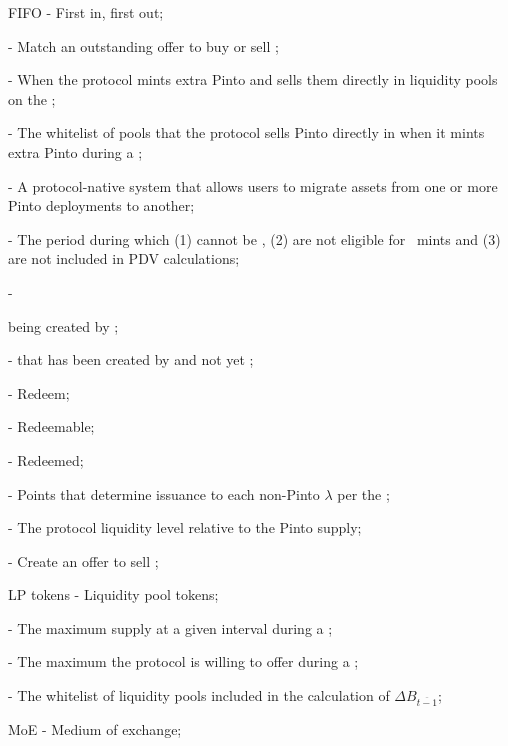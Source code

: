 \documentclass[class=article, crop=false]{standalone}
\begin{document}
\begin{itemize}[topsep=0pt, itemsep=3pt,leftmargin=16pt]
    \item[] FIFO - First in, first out;
    \item[]  - Match an outstanding offer to buy or sell ;
    \item[]  - When the protocol mints extra Pinto and sells them directly in liquidity pools on the ;
    \item[]  - The whitelist of pools that the protocol sells Pinto directly in when it mints extra Pinto during a ;
    \item[]  - A protocol-native system that allows users to migrate assets from one or more Pinto deployments to another;
    \item[]  - The period during which  (1) cannot be , (2) are not eligible for \Pinto\ mints and (3) are not included in  PDV calculations;
    \item[]  - { being created by ;
    \item[]  -  that has been created by  and not yet ;
    \item[]  - Redeem;
    \item[]  - Redeemable;
    \item[]  - Redeemed;
    \item[]  - Points that determine  issuance to each non-Pinto $\lambda$ per the ;
    \item[]  - The protocol liquidity level relative to the Pinto supply;
    \item[]  - Create an offer to sell ;
    \item[] LP tokens - Liquidity pool tokens;
    \item[]  - The maximum  supply at a given interval during a ;
    \item[]  - The maximum  the protocol is willing to offer during a ;
    \item[]  - The whitelist of liquidity pools included in the calculation of $\Delta B_{\overline{t-1}}$;
    \item[] MoE - Medium of exchange;
}
\end{itemize}
\end{document}
